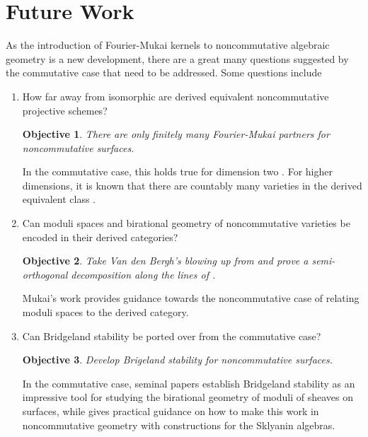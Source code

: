 \documentclass[11pt]{amsart}
\newtheorem{objective}{Objective}
\begin{document}

\section*{Future Work}

As the introduction of Fourier-Mukai kernels to noncommutative algebraic geometry is a new development, there are a great many questions suggested by the commutative case that need to be addressed.
Some questions include
\begin{enumerate}
\item
  How far away from isomorphic are derived equivalent noncommutative projective schemes?
  \begin{tcolorbox}
    \begin{objective}
      There are only finitely many Fourier-Mukai partners for noncommutative surfaces.
    \end{objective}
  \end{tcolorbox}
  In the commutative case, this holds true for dimension two \cite[Sect. 12]{HuyFMT}.
  For higher dimensions, it is known that there are countably many varieties in the derived equivalent class \cite{AnToe}.
\item
  Can moduli spaces and birational geometry of noncommutative varieties be encoded in their derived categories?
  \begin{tcolorbox}
    \begin{objective}
      Take Van den Bergh's blowing up from \cite{van2001blowing} and prove a semi-orthogonal decomposition along the lines of \cite{Bondal-Orlov}.
    \end{objective}
  \end{tcolorbox}
  Mukai's work \cite{Mukai81,Mukai87} provides guidance towards the noncommutative case of relating moduli spaces to the derived category.
\item
  Can Bridgeland stability be ported over from the commutative case?
  \begin{tcolorbox}
    \begin{objective}
      Develop Brigeland stability for noncommutative surfaces.
    \end{objective}
  \end{tcolorbox}
  In the commutative case, seminal papers \cite{Bri07, ABCH13, BM14a, BM14b} establish Bridgeland stability as an impressive tool for studying the birational geometry of moduli of sheaves on surfaces, while \cite{LiZhMMP} gives practical guidance on how to make this work in noncommutative geometry with constructions for the Sklyanin algebras.
\end{enumerate}
\end{document}
